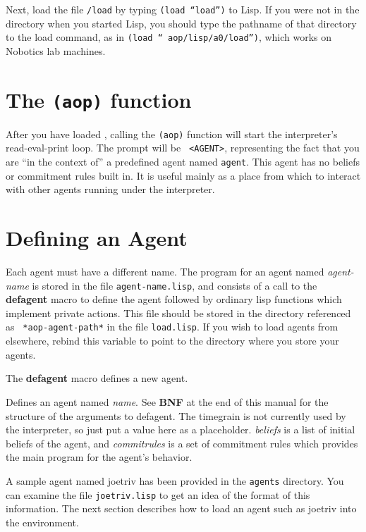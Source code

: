 Next, load the file {\tt <a0>/load} by typing {\tt (load ``load'')} to
Lisp.  If you were not in the {\tt <a0>} directory when you started
Lisp, you should type the pathname of that directory to the load
command, as in {\tt (load ``~aop/lisp/a0/load'')}, which works on
Nobotics lab machines.


\section{The {\tt (aop)} function}

After you have loaded \aop, calling the {\tt (aop)} function will
start the interpreter's read-eval-print loop.  The prompt will be {\tt
<AGENT>}, representing the fact that you are ``in the context of'' a
predefined agent named {\tt agent}.  This agent has no beliefs or
commitment rules built in.  It is useful mainly as a place from which
to interact with other agents running under the interpreter.


\section{Defining an Agent}

Each agent must have a different name.  The program for an agent named
{\em agent-name\/} is stored in the file {\tt agent-name.lisp}, and
consists of a call to the {\bf defagent} macro to define the agent
followed by ordinary lisp functions which implement private actions.
This file should be stored in the directory referenced as {\tt
*aop-agent-path*} in the file {\tt load.lisp}.  If you wish to load
agents from elsewhere, rebind this variable to point to the directory
where you store your agents.

The {\bf defagent} macro defines a new agent.

Defines an agent named {\em name}.  See {\bf BNF} at the end of this
manual for the structure of the arguments to defagent.  The timegrain
is not currently used by the interpreter, so just put a value here as
a placeholder.  {\em beliefs\/} is a list of initial beliefs of the
agent, and {\em commitrules\/} is a set of commitment rules which
provides the main program for the agent's behavior.

A sample agent named joetriv has been provided in the {\tt agents}
directory.  You can examine the file {\tt joetriv.lisp} to get an idea
of the format of this information.  The next section describes how to
load an agent such as joetriv into the environment.

